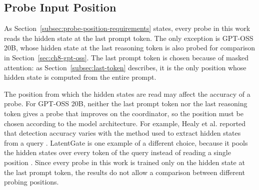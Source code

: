 \subsection{Probe Input Position}
\label{subsec:ch9-limitations-extraction}

As Section~\ref{subsec:probe-position-requirements} states, every probe in this work reads the hidden state at the last prompt token. The only exception is GPT-OSS 20B, whose hidden state at the last reasoning token is also probed for comparison in Section~\ref{sec:ch8-gpt-oss}. The last prompt token is chosen because of masked attention: as Section~\ref{subsec:last-token} describes, it is the only position whose hidden state is computed from the entire prompt.

The position from which the hidden states are read may affect the accuracy of a probe. For GPT-OSS 20B, neither the last prompt token nor the last reasoning token gives a probe that improves on the coordinator, so the position must be chosen according to the model architecture. For example, Healy et al. reported that detection accuracy varies with the method used to extract hidden states from a query \cite{healyInternalRepresentationsIndicators2026}. LatentGate is one example of a different choice, because it pools the hidden states over every token of the query instead of reading a single position \cite{ratnakarLatentGateLowLatencySemantic2026}. Since every probe in this work is trained only on the hidden state at the last prompt token, the results do not allow a comparison between different probing positions.
